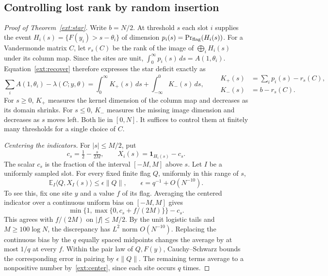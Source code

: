 \subsection{Controlling lost rank by random insertion}

\begin{proof}[Proof of Theorem~\ref{ext:star}]
Write $b=N/2$. At threshold $s$ each slot $i$ supplies the event
$H_i(s)=\{F(y_i)>s-\theta_i\}$ of dimension
$p_i(s)=\Pr_{\rm flag}(H_i(s))$. For a Vandermonde matrix $C$, let
$r_s(C)$ be the rank of the image of $\bigoplus_i H_i(s)$ under its
column map. Since the sites are unit,
$\int_0^\infty p_i(s)\,ds=A(1,\theta_i)$. Equation~\eqref{ext:recover}
therefore expresses the star deficit exactly as
\[
 \sum_i A(1,\theta_i)-\lambda(C;y,\theta)
   =\int_0^\infty K_+(s)\,ds+\int_{-\infty}^0 K_-(s)\,ds ,
 \qquad
 \begin{aligned}
 K_+(s)&=\sum_i p_i(s)-r_s(C),\\
 K_-(s)&=b-r_s(C).
 \end{aligned}
\]
For $s\ge0$, $K_+$ measures the kernel dimension of the column map
and decreases as its domain shrinks. For $s\le0$, $K_-$ measures the
missing image dimension and decreases as $s$ moves left. Both lie in
$[0,N]$. It suffices to control them at finitely many thresholds for
a single choice of $C$.

\emph{Centering the indicators.}
For $|s|\le M/2$, put
\[
 c_s=\tfrac12-\tfrac{s}{2M},\qquad X_i(s)=\mathbf1_{H_i(s)}-c_s .
\]
The scalar $c_s$ is the fraction of the interval $[-M,M]$ above $s$.
Let $I$ be a uniformly sampled slot. For every fixed finite flag
$Q$, uniformly in this range of $s$,
\begin{equation}\label{ext:meanflag}
 \mathbb E_I\langle Q,X_I(s)\rangle\le\epsilon\|Q\|,
 \qquad \epsilon=q^{-1}+O(N^{-10}).
\end{equation}
To see this, fix one site $y$ and a value $f$ of its flag. Averaging the
centered indicator over a continuous uniform bias on $[-M,M]$ gives
\[
 \min\{1,\max\{0,c_s+f/(2M)\}\}-c_s .
\]
This agrees with $f/(2M)$ on $|f|\le M/2$. By the unit logistic tails
and $M\ge100\log N$, the discrepancy has $L^2$ norm $O(N^{-10})$.
Replacing the continuous bias by the $q$ equally spaced midpoints
changes the average by at most $1/q$ at every $f$. Within the pair law
of $Q,F(y)$, Cauchy--Schwarz bounds the corresponding error in pairing
by $\epsilon\|Q\|$. The remaining terms average to a nonpositive
number by~\eqref{ext:center}, since each site occurs $q$ times.


\end{proof}
